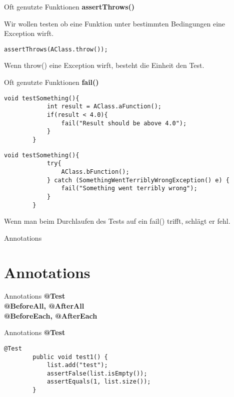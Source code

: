 \documentclass[10pt]{beamer}
\begin{document}
\begin{frame}[fragile]{Oft genutzte Funktionen}
     \textcolor{mygreen}{\textbf{assertThrows()}}
    
    Wir wollen testen ob eine Funktion unter bestimmten Bedingungen eine Exception wirft.

    \begin{lstlisting}[basicstyle=\ttfamily\scriptsize,gobble=8]
        assertThrows(AClass.throw());     
    \end{lstlisting}
    Wenn throw() eine Exception wirft, besteht die Einheit den Test.
\end{frame}

\begin{frame}[fragile]{Oft genutzte Funktionen}
     \textcolor{mygreen}{\textbf{fail()}}
    \begin{lstlisting}[basicstyle=\ttfamily\scriptsize,gobble=8]
        void testSomething(){
			int result = AClass.aFunction();
			if(result < 4.0){
				fail("Result should be above 4.0");
			}
		}     
    \end{lstlisting}
    \begin{lstlisting}[basicstyle=\ttfamily\scriptsize,gobble=8]
        void testSomething(){
			try{
				AClass.bFunction();
			} catch (SomethingWentTerriblyWrongException() e) {
				fail("Something went terribly wrong");
			}
		}     
    \end{lstlisting}
    Wenn man beim Durchlaufen des Tests auf ein fail() trifft, schlägt er fehl.
\end{frame}

\begin{frame}[fragile]{Annotations}
    \section{Annotations}
\end{frame}

\begin{frame}[fragile]{Annotations}
    \textcolor{mygreen}{\textbf{@Test}}\\
    \textcolor{mygreen}{\textbf{@BeforeAll, @AfterAll}}\\
    \textcolor{mygreen}{\textbf{@BeforeEach, @AfterEach}}\\
\end{frame}

\begin{frame}[fragile]{Annotations}
     \textcolor{mygreen}{\textbf{@Test}}
    \begin{lstlisting}[basicstyle=\ttfamily\scriptsize,gobble=8]
    	@Test		
    	public void test1() {					
            list.add("test");					
            assertFalse(list.isEmpty());			
            assertEquals(1, list.size());			
    	}
    \end{lstlisting}
\end{frame}
\end{document}
